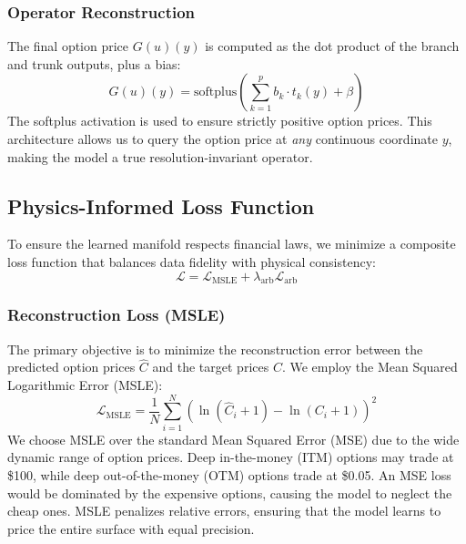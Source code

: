 \documentclass{article}
\newcommand\parens[1]{\left( #1 \right)}
\begin{document}
\subsubsection{Operator Reconstruction}
The final option price \(G(u)(y)\) is computed as the dot product of the branch and trunk outputs, plus a bias:
\[
    G(u)(y) = \text{softplus}\parens{\sum_{k=1}^p b_k \cdot t_k(y) + \beta}
\]
The softplus activation is used to ensure strictly positive option prices. This architecture allows us to query the option price at \emph{any} continuous coordinate \(y\), making the model a true resolution-invariant operator.

\subsection{Physics-Informed Loss Function}
To ensure the learned manifold respects financial laws, we minimize a composite loss function that balances data fidelity with physical consistency:
\[
    \mathcal{L} = \mathcal{L}_{\text{MSLE}} + \lambda_{\text{arb}} \mathcal{L}_{\text{arb}}
\]

\subsubsection{Reconstruction Loss (MSLE)}
The primary objective is to minimize the reconstruction error between the predicted option prices \(\hat{C}\) and the target prices \(C\). We employ the Mean Squared Logarithmic Error (MSLE):
\[
    \mathcal{L}_{\text{MSLE}} = \frac{1}{N} \sum_{i=1}^N \parens{\ln(\hat{C}_i + 1) - \ln(C_i + 1)}^2
\]
We choose MSLE over the standard Mean Squared Error (MSE) due to the wide dynamic range of option prices. Deep in-the-money (ITM) options may trade at \$100, while deep out-of-the-money (OTM) options trade at \$0.05. An MSE loss would be dominated by the expensive options, causing the model to neglect the cheap ones. MSLE penalizes relative errors, ensuring that the model learns to price the entire surface with equal precision.
\end{document}
